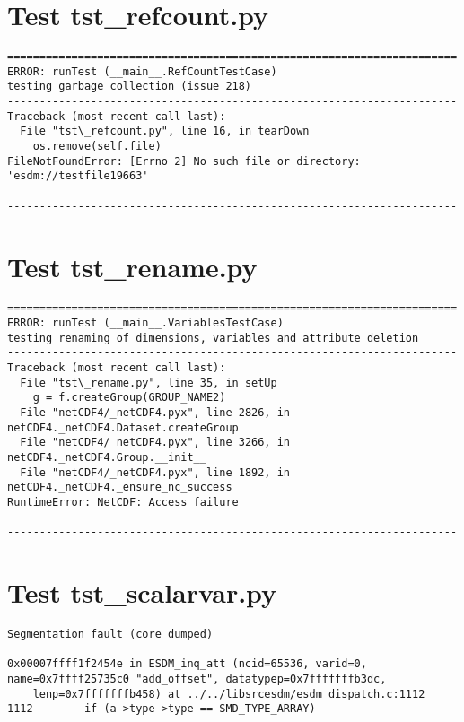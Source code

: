 \section{Test tst\_refcount.py}

\begin{verbatim}
======================================================================
ERROR: runTest (__main__.RefCountTestCase)
testing garbage collection (issue 218)
----------------------------------------------------------------------
Traceback (most recent call last):
  File "tst\_refcount.py", line 16, in tearDown
    os.remove(self.file)
FileNotFoundError: [Errno 2] No such file or directory: 'esdm://testfile19663'

----------------------------------------------------------------------
\end{verbatim}

\section{Test tst\_rename.py}

\begin{verbatim}
======================================================================
ERROR: runTest (__main__.VariablesTestCase)
testing renaming of dimensions, variables and attribute deletion
----------------------------------------------------------------------
Traceback (most recent call last):
  File "tst\_rename.py", line 35, in setUp
    g = f.createGroup(GROUP_NAME2)
  File "netCDF4/_netCDF4.pyx", line 2826, in netCDF4._netCDF4.Dataset.createGroup
  File "netCDF4/_netCDF4.pyx", line 3266, in netCDF4._netCDF4.Group.__init__
  File "netCDF4/_netCDF4.pyx", line 1892, in netCDF4._netCDF4._ensure_nc_success
RuntimeError: NetCDF: Access failure

----------------------------------------------------------------------
\end{verbatim}

\section{Test tst\_scalarvar.py}

\begin{verbatim}
Segmentation fault (core dumped)

0x00007ffff1f2454e in ESDM_inq_att (ncid=65536, varid=0, name=0x7ffff25735c0 "add_offset", datatypep=0x7fffffffb3dc,
    lenp=0x7fffffffb458) at ../../libsrcesdm/esdm_dispatch.c:1112
1112	    if (a->type->type == SMD_TYPE_ARRAY)
\end{verbatim}

